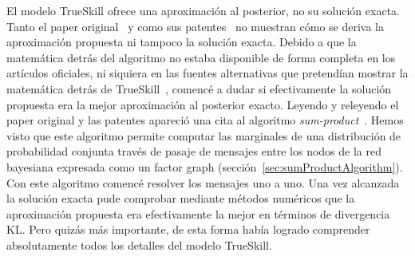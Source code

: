 \documentclass[a4paper,11pt]{book}
\newcommand{\N}{\mathcal{N}}
\theoremstyle{definition}
\begin{document}
El modelo TrueSkill ofrece una aproximaci\'on al posterior, no su soluci\'on exacta.
%
Tanto el paper original~\cite{Herbrich2007} y como sus patentes~\cite{trueskill_patent_06, trueskill_patent_09} no muestran c\'omo se deriva la aproximaci\'on propuesta ni tampoco la soluci\'on exacta.
%
Debido a que la matem\'atica detr\'as del algoritmo no estaba disponible de forma completa en los art\'iculos oficiales, ni siquiera en las fuentes alternativas que pretend\'ian mostrar la matem\'atica detr\'as de TrueSkill~\cite{Mosser2011}, comenc\'e a dudar si efectivamente la soluci\'on propuesta era la mejor aproximaci\'on al posterior exacto.
%
Leyendo y releyendo el paper original y las patentes apareci\'o una cita al algoritmo \emph{sum-product}~\cite{Kschischang2001}.
%
Hemos visto que este algoritmo permite computar las marginales de una distribuci\'on de probabilidad conjunta trav\'es de pasaje de mensajes entre los nodos de la red bayesiana expresada como un factor graph (secci\'on~\ref{sec:sumProductAlgorithm}).
%
%
Con este algoritmo comenc\'e resolver los mensajes uno a uno.
%
%
Una vez alcanzada la soluci\'on exacta pude comprobar mediante m\'etodos num\'ericos que la aproximaci\'on propuesta era efectivamente la mejor en t\'erminos de divergencia KL.
%
Pero quiz\'as m\'as importante, de esta forma hab\'ia logrado comprender absolutamente todos los detalles del modelo TrueSkill.
\end{document}
